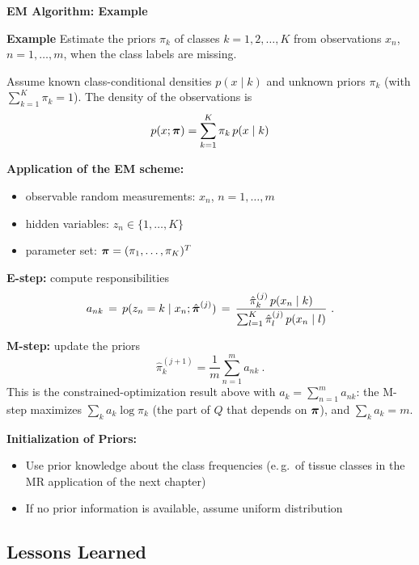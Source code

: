   \textbf{EM Algorithm: Example}

  \textbf{Example}
  \small
  Estimate the priors $\pi_k$ of classes $k=1,2, \dots, K$ from observations $x_n$, $n=1,\dots,m$, when the class labels are missing.

  Assume known class-conditional densities $p(x\mid k)$ and unknown priors $\pi_k$ (with $\sum_{k=1}^K \pi_k=1$). The density of the observations is
  {\footnotesize
  \begin{displaymath}
    p(x;\bm{\mathrm{\pi}}) = \sum_{k=1}^K \pi_k\,p(x\mid k)
  \end{displaymath}
  }

  \textbf{Application of the EM scheme:}
  \begin{itemize}
    \item observable random measurements: $x_n$, $n=1,\dots,m$
    \item hidden variables: $z_n\in\{1,\dots,K\}$
    \item parameter set: $\bm{\mathrm{\pi}}=(\pi_1,\dots,\pi_K)^T$
  \end{itemize}

  \textbf{E-step:} compute responsibilities
  {\footnotesize
  \begin{displaymath}
    a_{nk} \,=\, p(z_n=k\mid x_n;\hat{\bm{\mathrm{\pi}}}^{(j)})
    \,=\, \frac{\hat \pi_k^{(j)}\,p(x_n\mid k)}{\sum_{l=1}^K \hat \pi_l^{(j)}\,p(x_n\mid l)}~.
  \end{displaymath}
  }

  \textbf{M-step:} update the priors
  \begin{displaymath}
    \hat \pi_k^{(j+1)} = \frac{1}{m}\sum_{n=1}^m a_{nk}~.
  \end{displaymath}
  This is the constrained-optimization result above with $a_k=\sum_{n=1}^m a_{nk}$: the M-step maximizes $\sum_k a_k\log\pi_k$ (the part of $Q$ that depends on $\bm{\mathrm{\pi}}$), and $\sum_k a_k=m$.

  \textbf{Initialization of Priors:}

  \begin{itemize}
   \item Use prior knowledge about the class frequencies (e.\,g.\ of tissue classes in the MR application of the next chapter)      
   \item If no prior information is available, assume uniform distribution
  \end{itemize}
  
\subsection{Lessons Learned}

